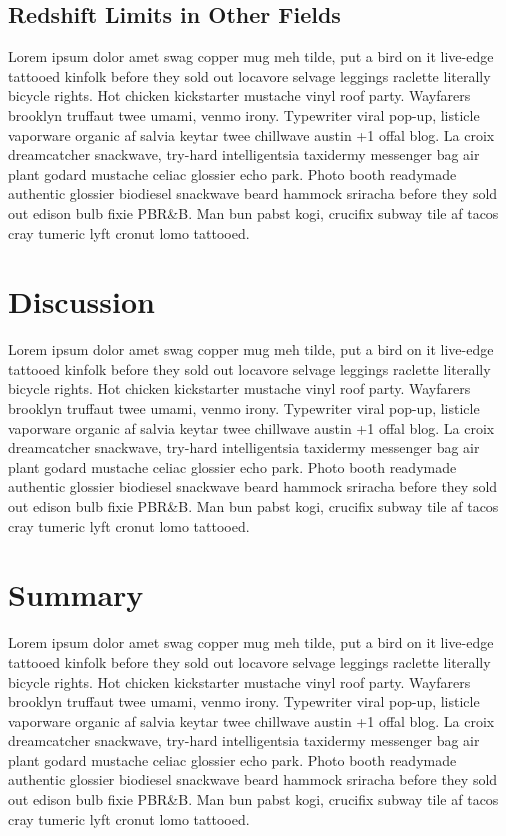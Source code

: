 \documentclass[apj, revtex4]{emulateapj}
\begin{document}
\subsection{Redshift Limits in Other Fields}

Lorem ipsum dolor amet swag copper mug meh tilde, put a bird on it live-edge tattooed kinfolk before they sold out locavore selvage leggings raclette literally bicycle rights. Hot chicken kickstarter mustache vinyl roof party. Wayfarers brooklyn truffaut twee umami, venmo irony. Typewriter viral pop-up, listicle vaporware organic af salvia keytar twee chillwave austin +1 offal blog. La croix dreamcatcher snackwave, try-hard intelligentsia taxidermy messenger bag air plant godard mustache celiac glossier echo park. Photo booth readymade authentic glossier biodiesel snackwave beard hammock sriracha before they sold out edison bulb fixie PBR\&B. Man bun pabst kogi, crucifix subway tile af tacos cray tumeric lyft cronut lomo tattooed.

\section{Discussion}\label{sec:discussion}

Lorem ipsum dolor amet swag copper mug meh tilde, put a bird on it live-edge tattooed kinfolk before they sold out locavore selvage leggings raclette literally bicycle rights. Hot chicken kickstarter mustache vinyl roof party. Wayfarers brooklyn truffaut twee umami, venmo irony. Typewriter viral pop-up, listicle vaporware organic af salvia keytar twee chillwave austin +1 offal blog. La croix dreamcatcher snackwave, try-hard intelligentsia taxidermy messenger bag air plant godard mustache celiac glossier echo park. Photo booth readymade authentic glossier biodiesel snackwave beard hammock sriracha before they sold out edison bulb fixie PBR\&B. Man bun pabst kogi, crucifix subway tile af tacos cray tumeric lyft cronut lomo tattooed.

\section{Summary}\label{sec:summary}

Lorem ipsum dolor amet swag copper mug meh tilde, put a bird on it live-edge tattooed kinfolk before they sold out locavore selvage leggings raclette literally bicycle rights. Hot chicken kickstarter mustache vinyl roof party. Wayfarers brooklyn truffaut twee umami, venmo irony. Typewriter viral pop-up, listicle vaporware organic af salvia keytar twee chillwave austin +1 offal blog. La croix dreamcatcher snackwave, try-hard intelligentsia taxidermy messenger bag air plant godard mustache celiac glossier echo park. Photo booth readymade authentic glossier biodiesel snackwave beard hammock sriracha before they sold out edison bulb fixie PBR\&B. Man bun pabst kogi, crucifix subway tile af tacos cray tumeric lyft cronut lomo tattooed.
\end{document}
